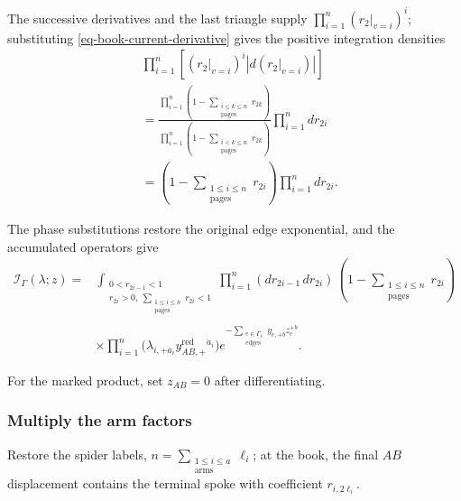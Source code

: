 \documentclass[11pt]{article}
\numberwithin{equation}{section}
\numberwithin{figure}{section}
\numberwithin{table}{section}
\begin{document}
The successive derivatives and the last triangle supply $\prod_{i=1}^n(\left.r_2\right|_{v=i})^i$; substituting \eqref{eq-book-current-derivative} gives the positive integration densities
\begin{equation*}
\begin{aligned}
    &\prod_{i=1}^{n}\left[
    \left(\left.r_2\right|_{v=i}\right)^i
    \left|d\!\left(\left.r_2\right|_{v=i}\right)\right|\right]\\
    &=\frac{\displaystyle\prod_{i=1}^{n}
    \left(1-\sum_{\substack{i\le k\le n\\\mathrm{pages}}}r_{2k}\right)}
    {\displaystyle\prod_{i=1}^{n}
    \left(1-\sum_{\substack{i<k\le n\\\mathrm{pages}}}r_{2k}\right)}
    \prod_{i=1}^{n}dr_{2i}\\
    &=\left(1-\sum_{\substack{1\le i\le n\\\mathrm{pages}}}r_{2i}\right)
    \prod_{i=1}^{n}dr_{2i}.
    \end{aligned}
\end{equation*}

The phase substitutions restore the original edge exponential, and the accumulated operators give
\begin{equation}\label{eq-book-current-determinant}
\begin{aligned}
    \mathcal I_\Gamma(\lambda;z)
    ={}&\int_{\substack{0<r_{2i-1}<1\\r_{2i}>0,\ \sum_{\substack{1\le i\le n\\\mathrm{pages}}}r_{2i}<1}}
    \prod_{i=1}^n(dr_{2i-1}\,dr_{2i})\,
    \left(1-\sum_{\substack{1\le i\le n\\\mathrm{pages}}}r_{2i}\right)\\
    &\times\prod_{i=1}^{n}
    \bigl(\lambda_{i,+\dot a_i}y_{AB,+}^{\mathrm{red}}{}^{\dot a_i}\bigr)
     e^{-\sum_{\substack{e\in\Gamma_1\\\mathrm{edges}}}y_{e,+\dot b}z_e^{+\dot b}}.
    \end{aligned}
\end{equation}

For the marked product, set $z_{AB}=0$ after differentiating.

\subsubsection{Multiply the arm factors}\label{local-B5-complete-heading}

Restore the spider labels, $n=\sum_{\substack{1\le i\le a\\\mathrm{arms}}}\ell_i$; at the book, the final $AB$ displacement contains the terminal spoke with coefficient $r_{i,2\ell_i}$.
\end{document}
